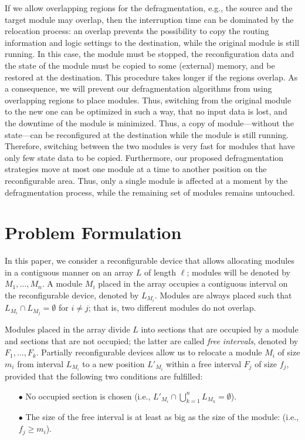 \documentclass{article}
\begin{document}
If we allow overlapping regions for the defragmentation, e.g., the source and
the target module may overlap, then the interruption time can be dominated by
the relocation process: an overlap prevents the possibility to copy the routing
information and logic settings to the destination, while the original module is
still running. In this case, the module must be stopped, the reconfiguration
data and the state of the module must be copied to some (external) memory, and
be restored at the destination. This procedure takes longer if the
regions overlap. As a consequence, we will prevent our defragmentation
algorithms from using overlapping regions to place modules. Thus, switching from
the original module to the new one can be optimized in such a way, that no
input data is lost, and the downtime of the module is minimized. Thus, a
copy of module---without the state---can be reconfigured at the destination
while the module is still running. Therefore, switching between the two modules
is very fast for modules that have only few state data to be copied.
Furthermore, our proposed defragmentation strategies move at most one module at a time to
another position on the reconfigurable area. Thus, only a single module is
affected at a moment by the defragmentation process, while the remaining set of
modules remains untouched. 

\section{Problem Formulation}
\label{sec:problem}

In this paper, we consider a reconfigurable device
that allows allocating modules in a contiguous manner
on an array $L$ of length $\ell$;
modules will be denoted by $M_1,\ldots,M_n$. A module $M_i$
placed in the array occupies a contiguous interval on the reconfigurable device,
denoted by $L_{M_i}$. Modules are always placed such that $L_{M_i}
\cap L_{M_j} = \emptyset$ for $i\neq j$; that is, two different modules
do not overlap.

Modules placed in the array divide $L$ into sections
that are occupied by a module and sections that are not occupied;
the latter are called {\em free intervals}, denoted by $F_1, \ldots, F_k$.
Partially reconfigurable devices allow us to relocate a module $M_i$ of size
$m_i$
from interval $L_{M_i}$ to a new position $L'_{M_i}$ within
a free interval $F_j$ of size $f_j$,
provided that the following two conditions are fulfilled:
\begin{enumerate}
\item[$\bullet$] 
No occupied section is chosen (i.e., 
$L'_{M_i} \cap \bigcup_{k=1}^n L_{M_k} = \emptyset$).

\item[$\bullet$] 
The size of the free interval is at least as big as the size of the module:
(i.e., $f_j \geq m_i$).

\end{enumerate}
\end{document}
